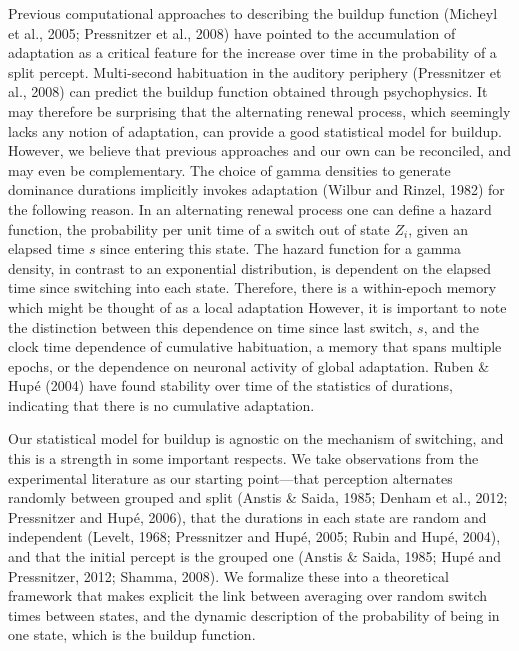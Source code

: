 Previous computational approaches to describing the buildup function (Micheyl et al., 2005; Pressnitzer et al., 2008) have pointed to the accumulation of adaptation as a critical feature for the increase over time in the probability of a split percept. Multi-second habituation in the auditory periphery (Pressnitzer et al., 2008) can predict the buildup function obtained through psychophysics. It may therefore be surprising that the alternating renewal process, which seemingly lacks any notion of adaptation, can provide a good statistical model for buildup.  However, we believe that previous approaches and our own can be reconciled, and may even be complementary. The choice of gamma densities to generate dominance durations implicitly invokes adaptation (Wilbur and Rinzel, 1982) for the following reason. In an alternating renewal process one can define a hazard function, the probability per unit time of a switch out of state $Z_i$, given an elapsed time $s$ since entering this state. The hazard function for a gamma density, in contrast to an exponential distribution, is dependent on the elapsed time since switching into each state. Therefore, there is a within-epoch memory which might be thought of as a local adaptation However, it is important to note the distinction between this dependence on time since last switch, $s$, and the clock time dependence of cumulative habituation, a memory that spans multiple epochs, or the dependence on neuronal activity of global adaptation. Ruben \& Hupé (2004) have found stability over time of the statistics of durations, indicating that there is no cumulative adaptation.

Our statistical model for buildup is agnostic on the mechanism of switching, and this is a strength in some important respects. We take observations from the experimental literature as our starting point—that perception alternates randomly between grouped and split (Anstis \& Saida, 1985; Denham et al., 2012; Pressnitzer and Hupé, 2006), that the durations in each state are random and independent (Levelt, 1968; Pressnitzer and Hupé, 2005; Rubin and Hupé, 2004), and that the initial percept is the grouped one (Anstis \& Saida, 1985; Hupé and Pressnitzer, 2012; Shamma, 2008). We formalize these into a theoretical framework that makes explicit the link between averaging over random switch times between states, and the dynamic description of the probability of being in one state, which is the buildup function. 

